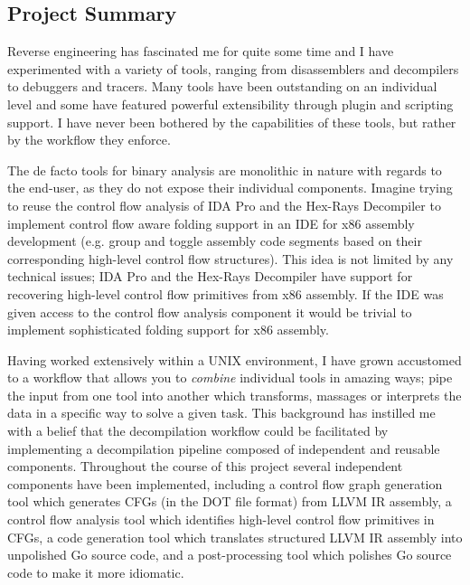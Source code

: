 
\subsection{Project Summary}

Reverse engineering has fascinated me for quite some time and I have experimented with a variety of tools, ranging from disassemblers and decompilers to debuggers and tracers. Many tools have been outstanding on an individual level and some have featured powerful extensibility through plugin and scripting support. I have never been bothered by the capabilities of these tools, but rather by the workflow they enforce.

The de facto tools for binary analysis are monolithic in nature with regards to the end-user, as they do not expose their individual components. Imagine trying to reuse the control flow analysis of IDA Pro and the Hex-Rays Decompiler to implement control flow aware folding support in an IDE for x86 assembly development (e.g. group and toggle assembly code segments based on their corresponding high-level control flow structures). This idea is not limited by any technical issues; IDA Pro and the Hex-Rays Decompiler have support for recovering high-level control flow primitives from x86 assembly. If the IDE was given access to the control flow analysis component it would be trivial to implement sophisticated folding support for x86 assembly.

Having worked extensively within a UNIX environment, I have grown accustomed to a workflow that allows you to \textit{combine} individual tools in amazing ways; pipe the input from one tool into another which transforms, massages or interprets the data in a specific way to solve a given task. This background has instilled me with a belief that the decompilation workflow could be facilitated by implementing a decompilation pipeline composed of independent and reusable components. Throughout the course of this project several independent components have been implemented, including a control flow graph generation tool which generates CFGs (in the DOT file format) from LLVM IR assembly, a control flow analysis tool which identifies high-level control flow primitives in CFGs, a code generation tool which translates structured LLVM IR assembly into unpolished Go source code, and a post-processing tool which polishes Go source code to make it more idiomatic.

